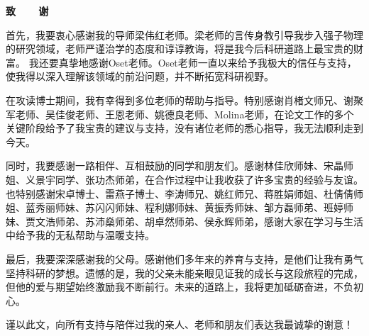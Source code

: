 \newpage
\thispagestyle{empty}
\fontsize{12pt}{13pt}\selectfont
\begin{center}
	{\xiaoerhao\textbf{致~~~~谢}}
\end{center}

%
%

首先，我要衷心感谢我的导师梁伟红老师。梁老师的言传身教引导我步入强子物理的研究领域，老师严谨治学的态度和谆谆教诲，将是我今后科研道路上最宝贵的财富。
我还要真挚地感谢Oset老师。Oset老师一直以来给予我极大的信任与支持，使我得以深入理解该领域的前沿问题，并不断拓宽科研视野。

在攻读博士期间，我有幸得到多位老师的帮助与指导。特别感谢肖楮文师兄、谢聚军老师、吴佳俊老师、王恩老师、姚德良老师、Molina老师，在论文工作的多个关键阶段给予了我宝贵的建议与支持，没有诸位老师的悉心指导，我无法顺利走到今天。

同时，我要感谢一路相伴、互相鼓励的同学和朋友们。感谢林佳欣师妹、宋晶师姐、义景宇同学、张功杰师弟，在合作过程中让我收获了许多宝贵的经验与友谊。也特别感谢宋卓博士、雷燕子博士、李涛师兄、姚红师兄、蒋胜娟师姐、杜倩倩师姐、蓝秀丽师妹、苏闪闪师妹、程利娜师妹、黄振秀师妹、邹方磊师弟、班婷师妹、贾文浩师弟、苏沛燊师弟、胡卓然师弟、侯永辉师弟，感谢大家在学习与生活中给予我的无私帮助与温暖支持。

最后，我要深深感谢我的父母。感谢他们多年来的养育与支持，是他们让我有勇气坚持科研的梦想。遗憾的是，我的父亲未能亲眼见证我的成长与这段旅程的完成，但他的爱与期望始终激励我不断前行。未来的道路上，我将更加砥砺奋进，不负初心。

谨以此文，向所有支持与陪伴过我的亲人、老师和朋友们表达我最诚挚的谢意！


\begin{flushleft}
\setlength{\parindent}{2em}
\par
\end{flushleft}
